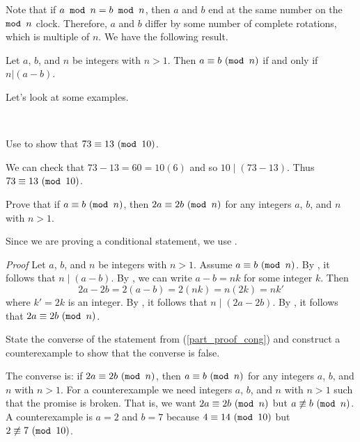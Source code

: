 Note that if $a \texttt{ mod } n = b \texttt{ mod } n$, then $a$ and $b$ end at the same number on the $\texttt{mod } n$ clock.  Therefore, $a$ and $b$ differ by some number of complete rotations, which is multiple of $n$.  We have the following result.

\begin{thm}
\label{thm_cong_modn}
    Let $a$, $b$, and $n$ be integers with $n > 1$.  Then $a \equiv b ~(\texttt{mod } n)$ if and only if $n | (a-b)$.
\end{thm}

Let's look at some examples.

\begin{exam}
\label{exam_alt_defn_cong}
~
    \begin{apart}
        \item Use  to show that $73 \equiv 13 ~(\texttt{mod } 10)$.
            \begin{soln}
                We can check that $73-13 = 60 = 10(6)$ and so $10 \mid (73-13)$. Thus $73 \equiv 13 ~(\texttt{mod } 10)$.
            \end{soln}
        \item \label{part_proof_cong} Prove that if $a \equiv b ~(\texttt{mod } n)$, then $2a \equiv 2b ~(\texttt{mod } n)$ for any integers $a$, $b$, and $n$ with $n > 1$.
            \begin{soln}
                Since we are proving a conditional statement, we use .

                \emph{Proof} Let $a$, $b$, and $n$ be integers with $n > 1$. Assume $a \equiv b ~(\texttt{mod } n)$.  By , it follows that $n \mid (a-b)$.  By , we can write $a-b = nk$ for some integer $k$.  Then
                $$ 2a - 2b = 2(a-b) = 2(nk) = n(2k) = nk'$$
                where $k' = 2k$ is an integer.  By , it follows that $n \mid (2a-2b).$  By , it follows that $2a \equiv 2b ~(\texttt{mod } n)$.
            \end{soln}
        \item State the converse of the statement from (\ref{part_proof_cong}) and construct a counterexample to show that the converse is false. 
            \begin{soln}
                The converse is: if $2a \equiv 2b ~(\texttt{mod } n)$, then $a \equiv b ~(\texttt{mod } n)$ for any integers $a$, $b$, and $n$ with $n > 1$.  For a counterexample we need integers $a$, $b$, and $n$ with $n > 1$ such that the promise is broken.  That is, we want $2a \equiv 2b ~(\texttt{mod } n)$ but $a \not\equiv b ~(\texttt{mod } n)$. A counterexample is $a=2$ and $b=7$ because $4 \equiv 14 ~(\texttt{mod } 10)$ but $2 \not\equiv 7 ~(\texttt{mod } 10)$.
            \end{soln}
    \end{apart}
\end{exam}


